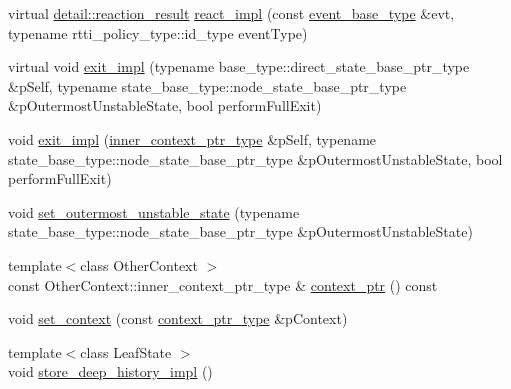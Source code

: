 \begin{DoxyCompactItemize}
\item 
virtual \mbox{\hyperlink{namespaceboost_1_1statechart_1_1detail_ab091bbb4c29327fb46ee479ea1b7255b}{detail\+::reaction\+\_\+result}} \mbox{\hyperlink{classboost_1_1statechart_1_1simple__state_aea845e975828260436775198e4c4e599}{react\+\_\+impl}} (const \mbox{\hyperlink{classboost_1_1statechart_1_1simple__state_a153e115715f5d828021a273ce282ba9b}{event\+\_\+base\+\_\+type}} \&evt, typename rtti\+\_\+policy\+\_\+type\+::id\+\_\+type event\+Type)
\item 
virtual void \mbox{\hyperlink{classboost_1_1statechart_1_1simple__state_a82e8a0fa7183343e0513e97eb704fdee}{exit\+\_\+impl}} (typename base\+\_\+type\+::direct\+\_\+state\+\_\+base\+\_\+ptr\+\_\+type \&p\+Self, typename state\+\_\+base\+\_\+type\+::node\+\_\+state\+\_\+base\+\_\+ptr\+\_\+type \&p\+Outermost\+Unstable\+State, bool perform\+Full\+Exit)
\item 
void \mbox{\hyperlink{classboost_1_1statechart_1_1simple__state_a480ae5f0e110cb8208bed7b25891dc17}{exit\+\_\+impl}} (\mbox{\hyperlink{classboost_1_1statechart_1_1simple__state_ad6d3233a11a23e91b4cc9edcae799379}{inner\+\_\+context\+\_\+ptr\+\_\+type}} \&p\+Self, typename state\+\_\+base\+\_\+type\+::node\+\_\+state\+\_\+base\+\_\+ptr\+\_\+type \&p\+Outermost\+Unstable\+State, bool perform\+Full\+Exit)
\item 
void \mbox{\hyperlink{classboost_1_1statechart_1_1simple__state_a371f219e75f23182309e4f2ecc71d399}{set\+\_\+outermost\+\_\+unstable\+\_\+state}} (typename state\+\_\+base\+\_\+type\+::node\+\_\+state\+\_\+base\+\_\+ptr\+\_\+type \&p\+Outermost\+Unstable\+State)
\item 
{\footnotesize template$<$class Other\+Context $>$ }\\const Other\+Context\+::inner\+\_\+context\+\_\+ptr\+\_\+type \& \mbox{\hyperlink{classboost_1_1statechart_1_1simple__state_aa873e22b50b0925f6a663583d6c5b216}{context\+\_\+ptr}} () const
\item 
void \mbox{\hyperlink{classboost_1_1statechart_1_1simple__state_a542332ad88c14626cd34459cea2ce11c}{set\+\_\+context}} (const \mbox{\hyperlink{classboost_1_1statechart_1_1simple__state_ac7e361322d53b3f57976ff23056b59e7}{context\+\_\+ptr\+\_\+type}} \&p\+Context)
\item 
{\footnotesize template$<$class Leaf\+State $>$ }\\void \mbox{\hyperlink{classboost_1_1statechart_1_1simple__state_a5d962dfc41522b59250e71ae5f01c30a}{store\+\_\+deep\+\_\+history\+\_\+impl}} ()
\end{DoxyCompactItemize}
